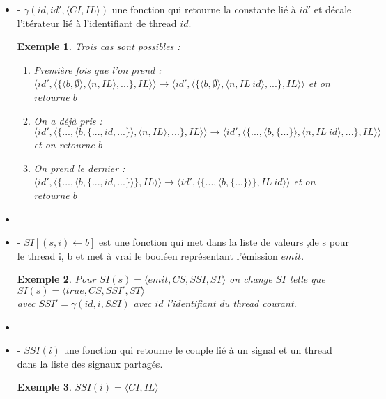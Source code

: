 \documentclass[10pt,a4paper]{report}
\newtheorem{ex}{Exemple}
\begin{document}
\begin{itemize}
\item[] - $\gamma(id,id',\langle CI,IL\rangle)$ une fonction qui retourne la constante lié à $id'$ et décale l'itérateur lié à l'identifiant de thread $id$.
\begin{ex}
	Trois cas sont possibles :
	\begin{enumerate}
		\item Première fois que l'on prend : $\langle id',\langle\{\langle b,\emptyset\rangle,\langle n,IL\rangle,...\},IL\rangle\rangle \rightarrow \langle id',\langle\{\langle b,\emptyset\rangle,\langle n,IL~id\rangle,...\},IL\rangle\rangle$ et on retourne $b$
		\item On a déjà pris : $\langle id',\langle\{...,\langle b,\{...,id,...\}\rangle,\langle n,IL\rangle,...\},IL\rangle\rangle \rightarrow \langle id',\langle\{...,\langle b,\{...\}\rangle,\langle n,IL~id\rangle,...\},IL\rangle\rangle$ et on retourne $b$
		\item On prend le dernier : $\langle id',\langle\{...,\langle b,\{...,id,...\}\rangle\},IL\rangle\rangle \rightarrow \langle id',\langle\{...,\langle b,\{...\}\rangle\},IL~id\rangle\rangle$ et on retourne $b$
	\end{enumerate}
\end{ex}
\item[] 

\item[] - $SI[(s,i) \leftarrow b]$ est une fonction qui met dans la liste de valeurs ,de s pour le thread i, b et met à vrai le booléen représentant l'émission $emit$.
\begin{ex}
	Pour $SI(s) = \langle emit,CS,SSI,ST\rangle$ on change $SI$ telle que $SI(s) = \langle true,CS,SSI',ST\rangle$\\ avec $SSI' = \gamma(id,i,SSI)$ avec $id$ l'identifiant du thread courant.
\end{ex}
\item[] 

\item[] - $SSI(i)$ une fonction qui retourne le couple lié à un signal et un thread dans la liste des signaux partagés.
\begin{ex}
	$SSI(i) = \langle CI,IL\rangle$
\end{ex}
\end{itemize}
\bigbreak
\end{document}
